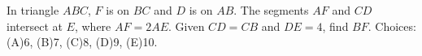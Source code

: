 In triangle $ABC$, $F$ is on $BC$ and $D$ is on $AB$. The segments $AF$ and $CD$ intersect at $E$, where $AF=2AE$. Given $CD=CB$ and $DE=4$, find $BF$. Choices: (A)6, (B)7, (C)8, (D)9, (E)10.
